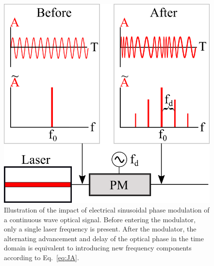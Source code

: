 \begin{figure}
    \centering
    \includegraphics[width=1\linewidth]{figures/PhaseModulator.png}
    \caption{Illustration of the impact of electrical sinusoidal phase modulation of a continuous wave optical signal. Before entering the modulator, only a single laser frequency is present. After the modulator, the alternating advancement and delay of the optical phase in the time domain is equivalent to introducing new frequency components according to Eq.~\ref{eq:JA}.}
    \label{fig:PM}
\end{figure}

